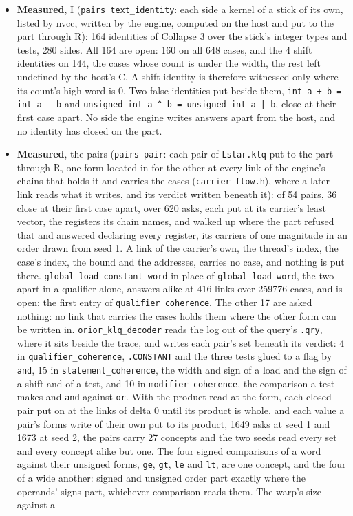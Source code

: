 \begin{itemize}
\item \textbf{Measured}, I (\texttt{pairs text\_\allowbreak{}identity}: each side a kernel of a stick of its own, listed by nvcc, written by the engine, computed on the host and put to the part through R): 164 identities of Collapse 3 over the stick's integer types and tests, 280 sides. All 164 are open: 160 on all 648 cases, and the 4 shift identities on 144, the cases whose count is under the width, the rest left undefined by the host's C. A shift identity is therefore witnessed only where its count's high word is 0. Two false identities put beside them, \texttt{int a + b = int a -\allowbreak{} b} and \texttt{unsigned int a \textasciicircum{} b = unsigned int a | b}, close at their first case apart. No side the engine writes answers apart from the host, and no identity has closed on the part.
\item \textbf{Measured}, the pairs (\texttt{pairs pair}: each pair of \texttt{Lstar.\allowbreak{}klq} put to the part through R, one form located in for the other at every link of the engine's chains that holds it and carries the cases (\texttt{carrier\_\allowbreak{}flow.\allowbreak{}h}), where a later link reads what it writes, and its verdict written beneath it): of 54 pairs, 36 close at their first case apart, over 620 asks, each put at its carrier's least vector, the registers its chain names, and walked up where the part refused that and answered declaring every register, its carriers of one magnitude in an order drawn from seed 1. A link of the carrier's own, the thread's index, the case's index, the bound and the addresses, carries no case, and nothing is put there. \texttt{global\_\allowbreak{}load\_\allowbreak{}constant\_\allowbreak{}word} in place of \texttt{global\_\allowbreak{}load\_\allowbreak{}word}, the two apart in a qualifier alone, answers alike at 416 links over 259776 cases, and is open: the first entry of \texttt{qualifier\_\allowbreak{}coherence}. The other 17 are asked nothing: no link that carries the cases holds them where the other form can be written in. \texttt{orior\_\allowbreak{}klq\_\allowbreak{}decoder} reads the log out of the query's \texttt{.\allowbreak{}qry}, where it sits beside the trace, and writes each pair's set beneath its verdict: 4 in \texttt{qualifier\_\allowbreak{}coherence}, \texttt{.\allowbreak{}CONSTANT} and the three tests glued to a flag by \texttt{and}, 15 in \texttt{statement\_\allowbreak{}coherence}, the width and sign of a load and the sign of a shift and of a test, and 10 in \texttt{modifier\_\allowbreak{}coherence}, the comparison a test makes and \texttt{and} against \texttt{or}. With the product read at the form, each closed pair put on at the links of delta 0 until its product is whole, and each value a pair's forms write of their own put to its product, 1649 asks at seed 1 and 1673 at seed 2, the pairs carry 27 concepts and the two seeds read every set and every concept alike but one. The four signed comparisons of a word against their unsigned forms, \texttt{ge}, \texttt{gt}, \texttt{le} and \texttt{lt}, are one concept, and the four of a wide another: signed and unsigned order part exactly where the operands' signs part, whichever comparison reads them. The warp's size against a 
\end{itemize}
